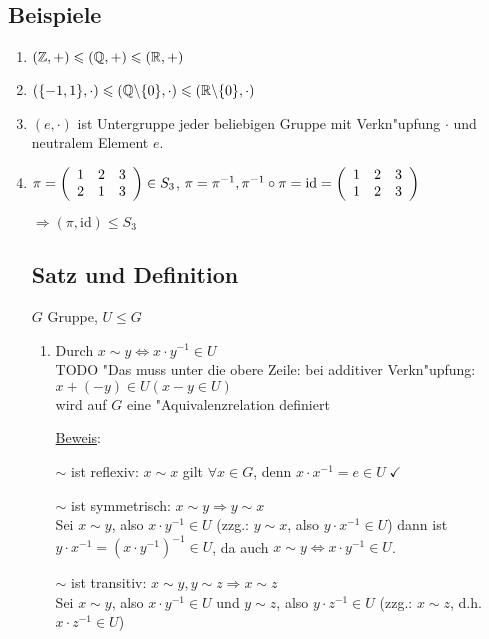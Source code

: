 \subsection{Beispiele}
\begin{enumerate}
	\item
	$(\Z, +) \leqslant (\Q, +) \leqslant (\R, +)$
	
	\item
	$(\{-1,1\}, \cdot) \leqslant (\Q \backslash \{0\}, \cdot) \leqslant (\R \backslash \{0\}, \cdot)$
	
	\item
	$(e, \cdot)$ ist Untergruppe jeder beliebigen Gruppe mit Verkn"upfung $\cdot$ und neutralem Element $e$.
	
	\item
	$\pi =
	\aMatrix{ccc}{
		1 & 2 & 3 \\
		2 & 1 & 3
		}
	\in S_3
	$,
	$\pi = \pi^{-1}, \pi^{-1} \circ \pi = \text{id} =
	\aMatrix{ccc}{
		1 & 2 & 3 \\
		1 & 2 & 3
		}
	$
	
	$\Rightarrow (\pi, \text{id})\leqslant S_3$
	
	\subsection[Satz und Definition: Rechtsnebenklassen]{Satz und Definition}
	$G$ Gruppe, $U \leqslant G$
	\begin{enumerate}
		\item
		Durch $x \sim y \Leftrightarrow x \cdot y^{-1} \in U$\\
		TODO "Das muss unter die obere Zeile: bei additiver Verkn"upfung: $x + (-y) \in U (x-y \in U)$\\
		wird auf $G$ eine "Aquivalenzrelation definiert
		
		\underline{Beweis}:
		
		$\sim$ ist reflexiv: $x \sim x$ gilt $\forall x \in G$, denn $x \cdot x^{-1}= e \in U \; \checkmark$
		
		$\sim$ ist symmetrisch: $x \sim y \Rightarrow y \sim x$\\
		 Sei $x \sim y$, also $x \cdot y^{-1} \in U$ (zzg.: $y \sim x$, also $y \cdot x^{-1} \in U$) dann ist $y \cdot x^{-1} = (x \cdot y^{-1})^{-1} \in U$, da auch $x \sim y \Leftrightarrow x \cdot y^{-1} \in U$.
		 
		$\sim$ ist transitiv: $x \sim y, y \sim z \Rightarrow x \sim z$\\
		Sei $x \sim y$, also $x \cdot y^{-1} \in U$ und $y \sim z$, also $y \cdot z^{-1} \in U$ (zzg.: $x \sim z$, d.h. $x\cdot z^{-1} \in U$)
		

\end{enumerate}
\end{enumerate}
